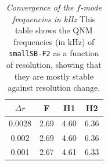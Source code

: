\documentclass[prd,aps,twocolumn,floats,floatfix,nofootinbib,superscriptaddress] {revtex4-1}
\begin{document}
\begin{table}[!h] 
\begin{center}
\begin{tabular}{||c | c c c||} 
 \hline
 $\Delta r$ & F & H1 & H2 \\ [0.5ex] 
 \hline\hline
 0.0028 & 2.69 & 4.60 & 6.36 \\ 
 \hline
 0.002 & 2.69 & 4.60 & 6.36 \\
 \hline
 0.001 & 2.67 & 4.61 & 6.33 \\
 \hline
\end{tabular}
\end{center}
\caption{\emph{Convergence of the $f$-mode frequencies in kHz}  This table shows the QNM frequencies (in kHz) of \texttt{smallSB-F2} as a function of resolution, showing that they are mostly stable against resolution change.}
\label{QNM_freq_convergence}
\end{table}


\end{document}
